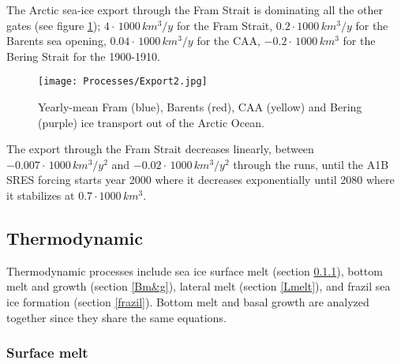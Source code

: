 The Arctic sea-ice export through the Fram Strait is dominating all the other gates (see figure \ref{export}); $4\cdot \, 1000 \,km^3/y$ for the Fram Strait, $0.2\cdot 1000\, km^3/y$ for the Barents sea opening, $0.04\cdot  \, 1000 \,km^3/y$ for the CAA, $-0.2\cdot  \, 1000 \,km^3$ for the Bering Strait for the 1900-1910. 
\begin{figure}[t!]
\center
\noindent\texttt{[image: Processes/Export2.jpg]}
\caption{Yearly-mean Fram (blue), Barents (red), CAA (yellow) and Bering (purple) ice transport out of the Arctic Ocean.}
\label{export}
\end{figure}
The export through the Fram Strait decreases linearly, between $-0.007 \cdot  \, 1000 \,km^3/y^2$ and $-0.02 \cdot \, 1000 \,km^3/y^2$ through the runs, until the A1B SRES forcing starts year 2000 where it decreases exponentially until 2080 where it stabilizes at $0.7 \cdot 1000 \, km^3$. 



\subsection{Thermodynamic}\label{TH}

Thermodynamic processes include sea ice surface melt (section \ref{Smelt}), bottom melt and growth (section \ref{Bm&g}), lateral melt (section \ref{Lmelt}), and frazil sea ice formation (section \ref{frazil}). Bottom melt and basal growth are analyzed together since they share the same equations. 

\subsubsection{Surface melt}\label{Smelt}

